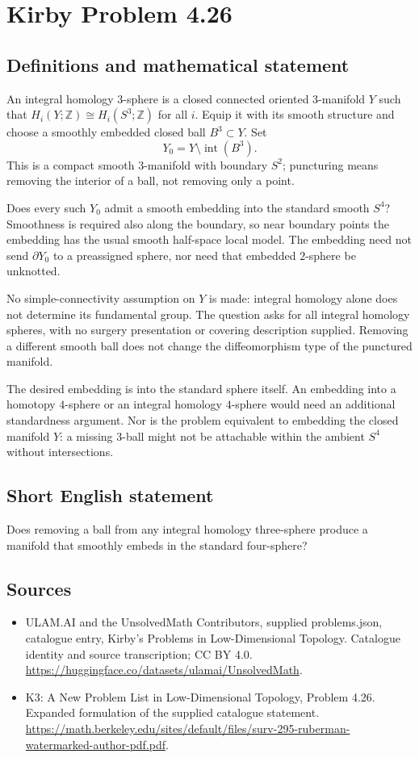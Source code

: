 \documentclass[11pt,a4paper]{article}
\begin{document}
\section*{Kirby Problem 4.26}\label{statement}

\subsection{Definitions and mathematical statement}
An integral homology $3$-sphere is a closed connected oriented
$3$-manifold $Y$ such that $H_i(Y;\mathbb Z)\cong H_i(S^3;\mathbb Z)$
for all $i$. Equip it with its smooth structure and choose a smoothly
embedded closed ball $B^3\subset Y$. Set
\[
 Y_0=Y\setminus\operatorname{int}(B^3).
\]
This is a compact smooth $3$-manifold with boundary $S^2$; puncturing
means removing the interior of a ball, not removing only a point.

Does every such $Y_0$ admit a smooth embedding into the standard
smooth $S^4$? Smoothness is required also along the boundary, so near
boundary points the embedding has the usual smooth half-space local
model. The embedding need not send $\partial Y_0$ to a preassigned
sphere, nor need that embedded $2$-sphere be unknotted.

No simple-connectivity assumption on $Y$ is made: integral homology
alone does not determine its fundamental group. The question asks
for all integral homology spheres, with no surgery presentation or
covering description supplied. Removing a different smooth ball does
not change the diffeomorphism type of the punctured manifold.

The desired embedding is into the standard sphere itself. An embedding
into a homotopy $4$-sphere or an integral homology $4$-sphere would
need an additional standardness argument. Nor is the problem equivalent
to embedding the closed manifold $Y$: a missing $3$-ball might not
be attachable within the ambient $S^4$ without intersections.
\subsection{Short English statement}
Does removing a ball from any integral homology three-sphere produce a manifold that smoothly embeds in the standard four-sphere?
\subsection{Sources}
\begin{itemize}
\item[S1] ULAM.AI and the UnsolvedMath Contributors, supplied problems.json, catalogue entry, Kirby's Problems in Low-Dimensional Topology. Catalogue identity and source transcription; CC BY 4.0.
\url{https://huggingface.co/datasets/ulamai/UnsolvedMath}.
\item[S2] K3: A New Problem List in Low-Dimensional Topology, Problem 4.26. Expanded formulation of the supplied catalogue statement.
\url{https://math.berkeley.edu/sites/default/files/surv-295-ruberman-watermarked-author-pdf.pdf}.
\end{itemize}
\end{document}
